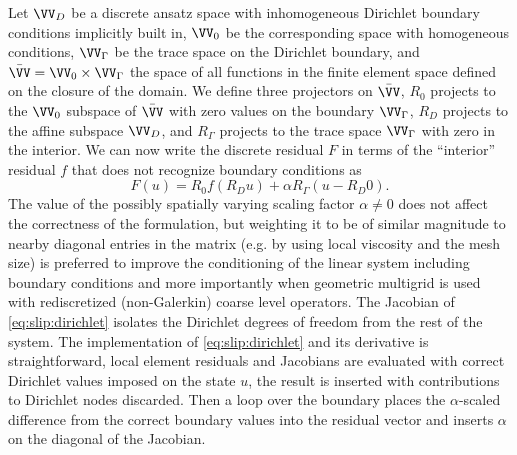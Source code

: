 Let $\VV_D$ be a discrete ansatz space with inhomogeneous Dirichlet boundary conditions implicitly built in, $\VV_0$ be the corresponding space with homogeneous conditions, $\VV_\Gamma$ be the trace space on the Dirichlet boundary, and $\bar\VV = \VV_0 \times \VV_\Gamma$ the space of all functions in the finite element space defined on the closure of the domain.
We define three projectors on $\bar\VV$,  $R_0$ projects to the $\VV_0$ subspace of $\bar\VV$ with zero values on the boundary $\VV_\Gamma$, $R_D$ projects to the affine subspace $\VV_D$, and $R_\Gamma$ projects to the trace space $\VV_\Gamma$ with zero in the interior.
We can now write the discrete residual $F$ in terms of the ``interior'' residual $f$ that does not recognize boundary conditions as
\begin{equation}\label{eq:slip:dirichlet}
  F(u) = R_0 f(R_D u) + \alpha R_\Gamma (u - R_D 0) .
\end{equation}
The value of the possibly spatially varying scaling factor $\alpha \ne 0$ does not affect the correctness of the formulation, but weighting it to be of similar magnitude to nearby diagonal entries in the matrix (e.g. by using local viscosity and the mesh size) is preferred to improve the conditioning of the linear system including boundary conditions and more importantly when geometric multigrid is used with rediscretized (non-Galerkin) coarse level operators.
The Jacobian of \eqref{eq:slip:dirichlet} isolates the Dirichlet degrees of freedom from the rest of the system.
The implementation of \eqref{eq:slip:dirichlet} and its derivative is straightforward, local element residuals and Jacobians are evaluated with correct Dirichlet values imposed on the state $u$, the result is inserted with contributions to Dirichlet nodes discarded.
Then a loop over the boundary places the $\alpha$-scaled difference from the correct boundary values into the residual vector and inserts $\alpha$ on the diagonal of the Jacobian.

